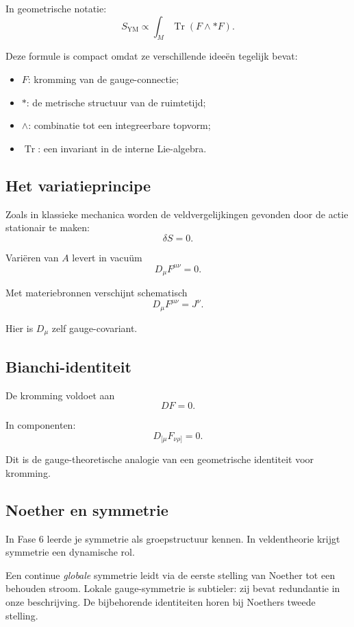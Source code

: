 \documentclass[11pt,a4paper]{article}
\newcommand{\Tr}{\operatorname{Tr}}
\begin{document}
In geometrische notatie:
\[
\boxed{S_{\mathrm{YM}}\propto \int_M \Tr(F\wedge *F).}
\]

Deze formule is compact omdat ze verschillende ideeën tegelijk bevat:
\begin{itemize}
    \item $F$: kromming van de gauge-connectie;
    \item $*$: de metrische structuur van de ruimtetijd;
    \item $\wedge$: combinatie tot een integreerbare topvorm;
    \item $\Tr$: een invariant in de interne Lie-algebra.
\end{itemize}

\subsection{Het variatieprincipe}

Zoals in klassieke mechanica worden de veldvergelijkingen gevonden door de actie stationair te maken:
\[
\delta S=0.
\]

Variëren van $A$ levert in vacuüm
\[
\boxed{D_\mu F^{\mu\nu}=0.}
\]

Met materiebronnen verschijnt schematisch
\[
D_\mu F^{\mu\nu}=J^\nu.
\]

Hier is $D_\mu$ zelf gauge-covariant.

\subsection{Bianchi-identiteit}

De kromming voldoet aan
\[
\boxed{DF=0.}
\]

In componenten:
\[
D_{[\mu}F_{\nu\rho]}=0.
\]

Dit is de gauge-theoretische analogie van een geometrische identiteit voor kromming.

\subsection{Noether en symmetrie}

In Fase 6 leerde je symmetrie als groepstructuur kennen. In veldentheorie krijgt symmetrie een dynamische rol.

Een continue \emph{globale} symmetrie leidt via de eerste stelling van Noether tot een behouden stroom. Lokale gauge-symmetrie is subtieler: zij bevat redundantie in onze beschrijving. De bijbehorende identiteiten horen bij Noethers tweede stelling.
\end{document}
